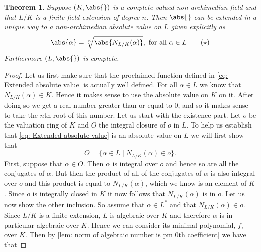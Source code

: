 \documentclass{article}
\newtheorem{theorem}{Theorem}[section]
\numberwithin{equation}{section}
\begin{document}
\begin{theorem}\label{thm: Extension of absolute value}
    Suppose $(K, \abs{})$ is a complete valued non-archimedian field and that $L/K$ is a finite field extension of degree $n$. Then $\abs{}$ can be extended in a unique way to a non-archimedian absolute value on $L$ given explicitly as
    \begin{equation}\label{eq: Extended absolute value}
        \abs{\alpha} = \sqrt[n]{\abs{N_{L/K}(\alpha)}}, \text{ for all } \alpha \in L\tag{$\star$}
    \end{equation}
    Furthermore $(L, \abs{})$ is complete.
\end{theorem}
\begin{proof}
    Let us first make sure that the proclaimed function defined in \cref{eq: Extended absolute value} is actually well defined. For all $\alpha \in L$ we know that $N_{L/K}(\alpha) \in K$. Hence it makes sense to use the absolute value on $K$ on it. After doing so we get a real number greater than or equal to 0, and so it makes sense to take the $n$th root of this number. Let us start with the existence part. Let $o$ be the valuation ring of $K$ and $O$ the integral closure of $o$ in $L$. To help us establish that \cref{eq: Extended absolute value} is an absolute value on $L$ we will first show that
    \begin{equation}\label{eq: Extension of absolute value helper result}
        O = \{\alpha \in L \mid N_{L/K}(\alpha) \in o \}.\tag{$\triangle$}
    \end{equation}
    First, suppose that $\alpha \in O$. Then $\alpha$ is integral over $o$ and hence so are all the conjugates of $\alpha$. But then the product of all of the conjugates of $\alpha$ is also integral over $o$ and this product is equal to $N_{L/K}(\alpha)$, which we know is an element of $K$. Since $o$ is integrally closed in $K$ it now follows that $N_{L/K}(\alpha)$ is in $o$. Let us now show the other inclusion. So assume that $\alpha \in L^*$ and that $N_{L/K}(\alpha) \in o$. Since $L / K$ is a finite extension, $L$ is algebraic over $K$ and therefore $\alpha$ is in particular algebraic over $K$. Hence we can consider its minimal polynomial, $f$, over $K$. Then by \cref{lem: norm of algebraic number is pm 0th coefficient} we have that

\end{proof}
\end{document}
